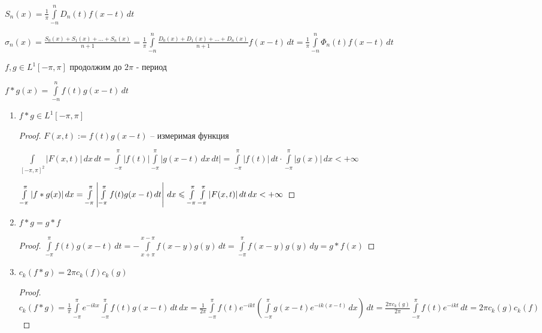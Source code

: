 $S_n(x) = \frac{1}{\pi} \int\limits_{-n}^nD_n(t)f(x - t)\, dt$

$\sigma_n(x) = \frac{S_0(x) + S_1(x) + \ldots + S_n(x)}{n+1} = \frac{1}{\pi} \int\limits_{-n}^n\frac{D_0(x) + D_1(x) + \ldots + D_n(x)}{n+1} f(x - t) \,dt = \frac{1}{\pi}\int\limits_{-n}^n \Phi_n(t) f(x - t)\,dt$

\begin{definition}\thmslashn

	$f, g \in L^1[-\pi, \pi]$ продолжим до $2\pi$ - период
	
	$f*g(x) = \int\limits_{-n}^n f(t) g(x -t)\,dt$

\end{definition}

\begin{consequence}\thmslashn
	
	\begin{enumerate}
		\item 
		$f*g \in L^1[-\pi, \pi]$
		
		\begin{proof}\thmslashn
			
			$F(x, t) := f(t)g(x - t)$ -- измеримая функция
			
			$\int\limits_{[-\pi, \pi]^2}|F(x, t)|\,dx\,dt = \int\limits_{-\pi}^\pi |f(t)|\int\limits_{-\pi}^\pi |g(x - t)\,dx\,dt| = \int\limits_{-\pi}^\pi |f(t)|\,dt \cdot \int\limits_{-\pi}^\pi |g(x)|\,dx < +\infty$
			
			$\int\limits_{-\pi}^\pi |f * g(x)|\,dx = \int\limits_{-\pi}^\pi\left|\int\limits_{-\pi}^\pi f(t)g(x - t)\,dt\right|\,dx \leqslant \int\limits_{-\pi}^\pi\int\limits_{-\pi}^\pi|F(x, t)|\,dt\,dx < +\infty$
			
		\end{proof}
	
		\item
		$f*g = g*f$
		
		\begin{proof}\thmslashn
			
			$\int\limits_{-\pi}^\pi f(t) g(x - t)\,dt = - \int\limits_{x + \pi}^{x- \pi} f(x - y)g(y)\,dt = \int\limits_{-\pi}^\pi f(x - y)g(y)\,dy = g*f(x)$
		
		\end{proof}
	
		\item
		$c_k(f*g) = 2\pi c_k(f)c_k(g)$
		
		\begin{proof}\thmslashn
			
			$c_k(f*g) = \frac{1}{\pi} \int\limits_{-\pi}^\pi  e^{-i k x} \int\limits_{-\pi}^\pi  f(t) g(x - t)\,dt \,dx = \frac{1}{2\pi} \int\limits_{-\pi}^\pi f(t)e^{-ikt}\left( \int\limits_{-\pi}^\pi g(x - t) e^{-ik(x - t)}\,dx \right)\,dt = \frac{2\pi c_k(g)}{2\pi} \int\limits_{-\pi}^\pi f(t)e^{-ikt}\,dt = 2\pi c_k(g)c_k(f)$
		

\end{proof}
\end{enumerate}
\end{consequence}
